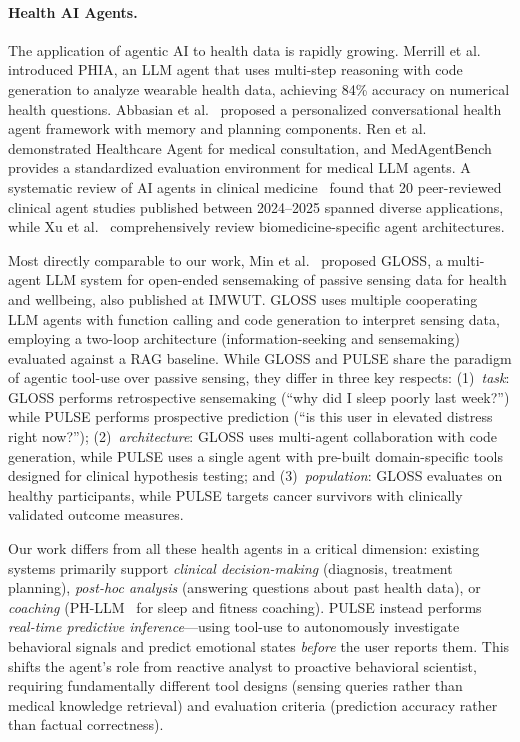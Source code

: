 \documentclass[screen,review,anonymous]{acmart}
\newcommand{\sysshort}{PULSE}
\begin{document}
\paragraph{Health AI Agents.}
The application of agentic AI to health data is rapidly growing. Merrill et al.~\cite{merrill2025phia} introduced PHIA, an LLM agent that uses multi-step reasoning with code generation to analyze wearable health data, achieving 84\% accuracy on numerical health questions. Abbasian et al.~\cite{abbasian2024conversational_health} proposed a personalized conversational health agent framework with memory and planning components. Ren et al.~\cite{ren2025healthcare_agent} demonstrated Healthcare Agent for medical consultation, and MedAgentBench~\cite{jiang2025medagentbench} provides a standardized evaluation environment for medical LLM agents. A systematic review of AI agents in clinical medicine~\cite{gorenshtein2025ai_agents_clinical} found that 20 peer-reviewed clinical agent studies published between 2024--2025 spanned diverse applications, while Xu et al.~\cite{xu2025llm_biomedical_agents} comprehensively review biomedicine-specific agent architectures.

Most directly comparable to our work, Min et al.~\cite{min2025gloss} proposed GLOSS, a multi-agent LLM system for open-ended sensemaking of passive sensing data for health and wellbeing, also published at IMWUT. GLOSS uses multiple cooperating LLM agents with function calling and code generation to interpret sensing data, employing a two-loop architecture (information-seeking and sensemaking) evaluated against a RAG baseline. While GLOSS and \sysshort{} share the paradigm of agentic tool-use over passive sensing, they differ in three key respects: (1)~\emph{task}: GLOSS performs retrospective sensemaking (``why did I sleep poorly last week?'') while \sysshort{} performs prospective prediction (``is this user in elevated distress right now?''); (2)~\emph{architecture}: GLOSS uses multi-agent collaboration with code generation, while \sysshort{} uses a single agent with pre-built domain-specific tools designed for clinical hypothesis testing; and (3)~\emph{population}: GLOSS evaluates on healthy participants, while \sysshort{} targets cancer survivors with clinically validated outcome measures.

Our work differs from all these health agents in a critical dimension: existing systems primarily support \emph{clinical decision-making} (diagnosis, treatment planning), \emph{post-hoc analysis} (answering questions about past health data), or \emph{coaching} (PH-LLM~\cite{cosentino2025phllm} for sleep and fitness coaching). \sysshort{} instead performs \emph{real-time predictive inference}---using tool-use to autonomously investigate behavioral signals and predict emotional states \emph{before} the user reports them. This shifts the agent's role from reactive analyst to proactive behavioral scientist, requiring fundamentally different tool designs (sensing queries rather than medical knowledge retrieval) and evaluation criteria (prediction accuracy rather than factual correctness).
\end{document}
